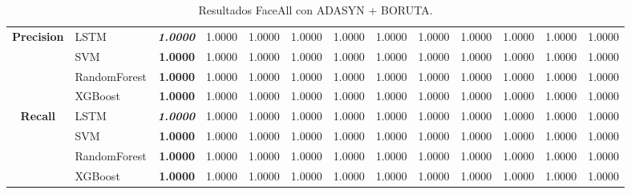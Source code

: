 \begin{table}[H]
\begin{adjustbox}{max width=14cm}
\begin{tabular}{|c|l|r|r|r|r|r|r|r|r|r|r|r|}
			\textbf{Precision} & LSTM &  \textit{\textbf{1.0000}} &  1.0000 &  1.0000 &  1.0000 &  1.0000 &  1.0000 &  1.0000 &  1.0000 &  1.0000 &  1.0000 &  1.0000 \\
			& SVM &  \textbf{1.0000} &  1.0000 &  1.0000 &  1.0000 &  1.0000 &  1.0000 &  1.0000 &  1.0000 &  1.0000 &  1.0000 &  1.0000 \\
			& RandomForest &  \textbf{1.0000} &  1.0000 &  1.0000 &  1.0000 &  1.0000 &  1.0000 &  1.0000 &  1.0000 &  1.0000 &  1.0000 &  1.0000 \\
			& XGBoost &  \textbf{1.0000} &  1.0000 &  1.0000 &  1.0000 &  1.0000 &  1.0000 &  1.0000 &  1.0000 &  1.0000 &  1.0000 &  1.0000 \\
			\hline
			\textbf{Recall} & LSTM &  \textit{\textbf{1.0000}} &  1.0000 &  1.0000 &  1.0000 &  1.0000 &  1.0000 &  1.0000 &  1.0000 &  1.0000 &  1.0000 &  1.0000 \\
			& SVM &  \textbf{1.0000} &  1.0000 &  1.0000 &  1.0000 &  1.0000 &  1.0000 &  1.0000 &  1.0000 &  1.0000 &  1.0000 &  1.0000 \\
			& RandomForest &  \textbf{1.0000} &  1.0000 &  1.0000 &  1.0000 &  1.0000 &  1.0000 &  1.0000 &  1.0000 &  1.0000 &  1.0000 &  1.0000 \\
			& XGBoost &  \textbf{1.0000} &  1.0000 &  1.0000 &  1.0000 &  1.0000 &  1.0000 &  1.0000 &  1.0000 &  1.0000 &  1.0000 &  1.0000 \\
			\hline
			
		\end{tabular}
	\end{adjustbox}	
	\caption{Resultados FaceAll con ADASYN + BORUTA.}
	\label{tab:faceAllADASYNBORUTA}
\end{table}

